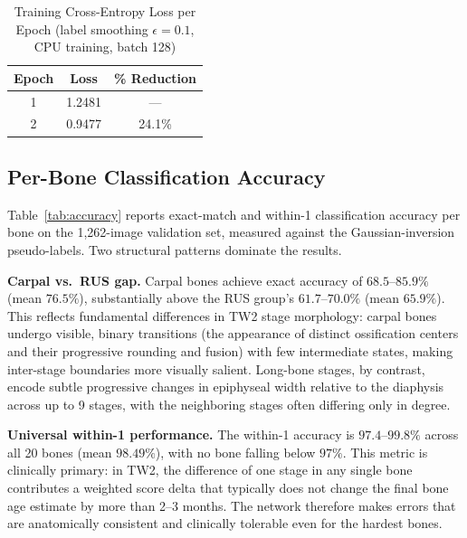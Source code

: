 \documentclass[journal]{IEEEtran}
\begin{document}
\begin{table}[!t]
  \centering
  \caption{Training Cross-Entropy Loss per Epoch
    (label smoothing $\epsilon{=}0.1$, CPU training, batch 128)}
  \label{tab:loss}
  \begin{tabular}{ccc}
    \toprule
    Epoch & Loss & \% Reduction \\
    \midrule
    1 & 1.2481 & — \\
    2 & 0.9477 & 24.1\% \\
    \bottomrule
  \end{tabular}
\end{table}

\subsection{Per-Bone Classification Accuracy}

Table~\ref{tab:accuracy} reports exact-match and within-1
classification accuracy per bone on the 1,262-image validation set,
measured against the Gaussian-inversion pseudo-labels.
Two structural patterns dominate the results.

\textbf{Carpal vs.\ RUS gap.}
Carpal bones achieve exact accuracy of $68.5$--$85.9\%$ (mean
$76.5\%$), substantially above the RUS group's $61.7$--$70.0\%$
(mean $65.9\%$).
This reflects fundamental differences in TW2 stage morphology:
carpal bones undergo visible, binary transitions (the appearance
of distinct ossification centers and their progressive rounding
and fusion) with few intermediate states, making inter-stage
boundaries more visually salient.
Long-bone stages, by contrast, encode subtle progressive changes
in epiphyseal width relative to the diaphysis across up to 9 stages,
with the neighboring stages often differing only in degree.

\textbf{Universal within-1 performance.}
The within-1 accuracy is $97.4$--$99.8\%$ across all 20 bones
(mean $98.49\%$), with no bone falling below $97\%$.
This metric is clinically primary: in TW2, the difference of one
stage in any single bone contributes a weighted score delta that
typically does not change the final bone age estimate by more than
2--3 months.
The network therefore makes errors that are anatomically consistent
and clinically tolerable even for the hardest bones.
\end{document}
